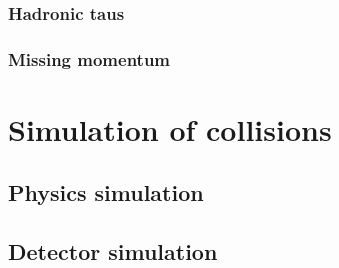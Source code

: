 \subsubsection{Hadronic taus}

\subsubsection{Missing momentum}
\label{sec:cms:met}


\section{Simulation of collisions}

\subsection{Physics simulation}

\subsection{Detector simulation}

